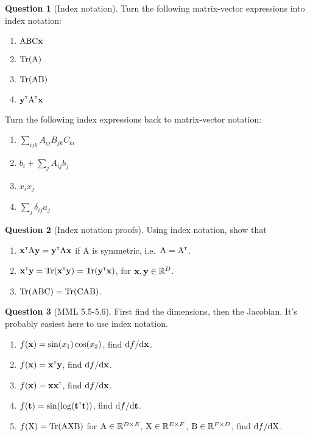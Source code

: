\documentclass[a4paper]{article}
\newcommand{\mat}[1]{{\mathrm{{#1}}}} %
\theoremstyle{definition}
\newtheorem{question}{Question}
\begin{document}
\begin{question}[Index notation] Turn the following matrix-vector expressions into index notation:
\begin{multicols}{2}
\begin{enumerate}[label=\alph*.]
\item $\mat A \mat B \mat C \vx$
\item $\Tr(\mat A)$
\item $\Tr(\mat A \mat B)$
\item $\vy\transpose \mat A\transpose \vx$
\end{enumerate}
\end{multicols}
Turn the following index expressions back to matrix-vector notation:
\begin{multicols}{2}
\begin{enumerate}[label=\alph*.]
\item $\sum_{ijk} A_{ij}B_{jk}C_{ki}$
\item $b_i + \sum_j A_{ij}b_j$
\item $x_ix_j$
\item $\sum_j \delta_{ij}a_j$
\end{enumerate}
\end{multicols}
\end{question}

\begin{question}[Index notation proofs]
\label{q:ind-not-proof}
Using index notation, show that
\begin{enumerate}
\item $\vx\transpose \mat A\vy = \vy\transpose \mat A\vx$ if $\mat A$ is symmetric, i.e.~$\mat A = \mat A\transpose$.
\item $\mathbf{x}^\mathrm{\textsf{\tiny T}}\mathbf{y} = \operatorname{Tr}(\mathbf{x}^\mathrm{\textsf{\tiny T}}\mathbf{y}) = \operatorname{Tr}(\mathbf{y}^\mathrm{\textsf{\tiny T}}\mathbf{x})$, for $\mathbf{x},\mathbf{y}\in\mathbb{R}^D$.
\item $\Tr(\mat A\mat B\mat C) = \Tr(\mat C\mat A\mat B)$.
\end{enumerate}
\end{question}

\begin{question}[MML 5.5-5.6]
First find the dimensions, then the Jacobian. It's probably easiest here to use index notation.
\begin{enumerate}[label=\alph*.]
\item $f(\mathbf{x}) = \sin(x_1)\cos(x_2)$, find $\mathrm{d} f/\mathrm{d}\mathbf{x}$.
\item $f(\mathbf{x}) = \mathbf{x}^\mathrm{\textsf{\tiny T}}\mathbf{y}$, find $\mathrm{d} f/\mathrm{d}\mathbf{x}$.
\item $f(\mathbf{x}) = \mathbf{x}\mathbf{x}^\mathrm{\textsf{\tiny T}}$, find $\mathrm{d} f/\mathrm{d}\mathbf{x}$.
\item $f(\mathbf{t}) = \sin(\log(\mathbf{t}^\mathrm{\textsf{\tiny T}}\mathbf{t}))$, find $\mathrm{d} f/\mathrm{d}\mathbf{t}$.
\item $f(\mat X) = \Tr(\mat A \mat X \mat B)$ for $\mat A \in \Reals^{D\times E}$, $\mat X \in \Reals^{E\times F}$, $\mat B \in \Reals^{F\times D}$, find $\calcd f/\calcd\mat X$.
\end{enumerate}
\end{question}
\end{document}
